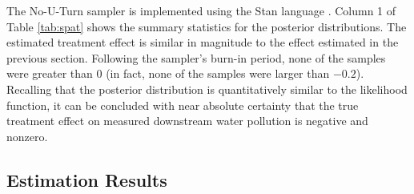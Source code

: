 \documentclass[12pt]{article}
\begin{document}
The No-U-Turn sampler is implemented using the Stan language \citep{carpenter2015}. Column 1 of Table \ref{tab:spat} shows the summary statistics for the posterior distributions. The estimated treatment effect is similar in magnitude to the effect estimated in the previous section. Following the sampler's burn-in period, none of the samples were greater than 0 (in fact, none of the samples were larger than $-0.2$). Recalling that the posterior distribution is quantitatively similar to the likelihood function, it can be concluded with near absolute certainty that the true treatment effect on measured downstream water pollution is negative and nonzero. 

\subsection{Estimation Results}
\end{document}
